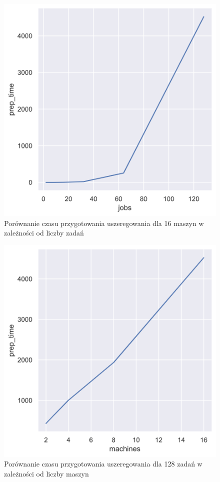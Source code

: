 \documentclass[brudnopis]{xmgr}
\begin{document}
\begin{figure}[!tbh]
\centering
\includegraphics[width=.8\hsize]{fig/relplot_128j.png}
\caption{Porównanie czasu przygotowania uszeregowania dla 16 maszyn w zależności od liczby zadań\label{diag:relplot_128j}}
\end{figure}\medskip

\begin{figure}[!tbh]
\centering
\includegraphics[width=.8\hsize]{fig/relplot_16m.png}
\caption{Porównanie czasu przygotowania uszeregowania dla 128 zadań w zależności od liczby maszyn\label{diag:relplot_16m}}
\end{figure}\medskip
\end{document}
